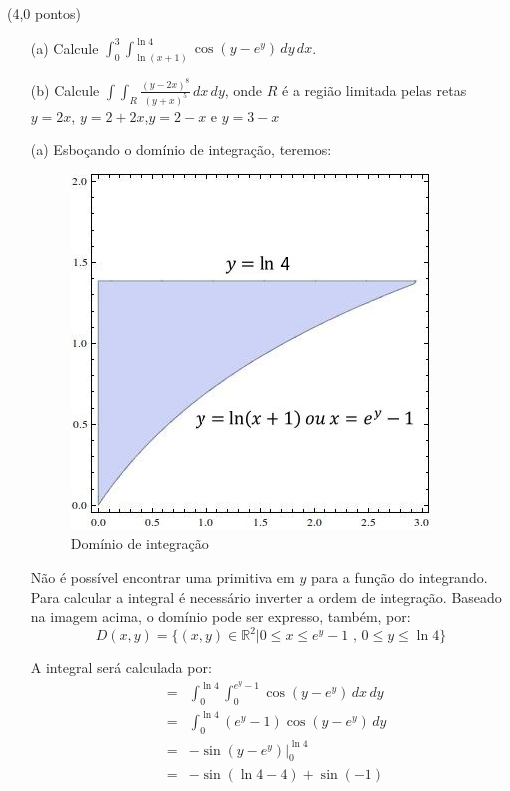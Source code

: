 \documentclass[12pt,a4paper]{article}
\newcommand{\re}{\mathbb{R}}
\begin{document}

(4,0 pontos)
\begin{itemize}
	\item[(a)] Calcule $ \displaystyle{ \int_{0}^{3}  \int_{\ln{(x+1)}}^{\ln{4}} \cos{(y-e^y)}\,dy\, dx } $.
	
	\item[(b)] Calcule $\displaystyle{\int\!\!\!\int_R \frac{(y-2x)^8}{(y+x)^5}\,dx\,dy}$, onde $R$ é a região limitada pelas retas $y=2x$, $y=2+2x$,$y=2-x$ e $y=3-x$
	
\end{itemize}


\begin{itemize}
    \item[(a)] Esboçando o domínio de integração, teremos:
    \\
    

\begin{figure}[h!]
	\centering
	\includegraphics[scale=0.5]{Q1aB.jpg}  
	\caption{Domínio de integração}
	\label{fig:figura7}
\end{figure}

Não é possível encontrar uma primitiva em $y$ para a função do integrando. Para calcular a integral é necessário inverter a ordem de integração. Baseado na imagem acima, o domínio pode ser expresso, também, por:
$$D(x,y)=\{(x,y)\in\re^2 | 0\leq x \leq e^y-1\,\, \mbox{,}\,\,0\leq y \leq \ln{4}\}$$

A integral será calculada por:
\begin{eqnarray*}
&=&\int_0^{\ln{4}}\!\!\!\int_0^{e^y-1}\cos{(y-e^y)}\,dx\,dy\\
&=&\int_0^{\ln{4}} (e^y-1)\cos{(y-e^y)}\,dy\\
&=&-\sin{(y-e^y)}\Big|_0^{\ln{4}}\\
&=&-\sin{(\ln{4}-4)}+\sin{(-1)}
\end{eqnarray*}



\end{itemize}
\end{document}
